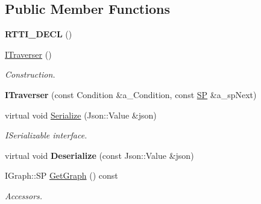 \subsection*{Public Member Functions}
\begin{DoxyCompactItemize}
\item 
\mbox{\label{class_i_graph_1_1_i_traverser_a254b5757511fee6f33c760df3f0a32df}} 
{\bfseries R\+T\+T\+I\+\_\+\+D\+E\+CL} ()
\item 
\mbox{\label{class_i_graph_1_1_i_traverser_afbc0456a78d7984d673726d8c538fe42}} 
\hyperlink{class_i_graph_1_1_i_traverser_afbc0456a78d7984d673726d8c538fe42}{I\+Traverser} ()
\begin{DoxyCompactList}\small\item\em Construction. \end{DoxyCompactList}\item 
\mbox{\label{class_i_graph_1_1_i_traverser_a7a365e0f8a649cf76c30e31a0a84d74a}} 
{\bfseries I\+Traverser} (const Condition \&a\+\_\+\+Condition, const \hyperlink{class_i_graph_1_1_i_traverser_a5a5ccc81423d6024742d1898a310d812}{SP} \&a\+\_\+sp\+Next)
\item 
\mbox{\label{class_i_graph_1_1_i_traverser_a76431f57457c4e894c354b1df326d1bf}} 
virtual void \hyperlink{class_i_graph_1_1_i_traverser_a76431f57457c4e894c354b1df326d1bf}{Serialize} (Json\+::\+Value \&json)
\begin{DoxyCompactList}\small\item\em I\+Serializable interface. \end{DoxyCompactList}\item 
\mbox{\label{class_i_graph_1_1_i_traverser_a1789c5e9328f7d33d2f6e68069597a95}} 
virtual void {\bfseries Deserialize} (const Json\+::\+Value \&json)
\item 
\mbox{\label{class_i_graph_1_1_i_traverser_a4c074c64cb2a46a40d8d2e3daff61765}} 
I\+Graph\+::\+SP \hyperlink{class_i_graph_1_1_i_traverser_a4c074c64cb2a46a40d8d2e3daff61765}{Get\+Graph} () const
\begin{DoxyCompactList}\small\item\em Accessors. \end{DoxyCompactList}\item 

\end{DoxyCompactItemize}
